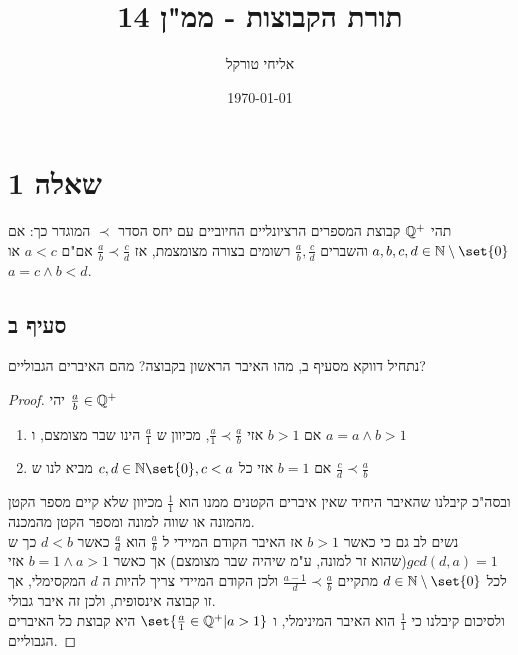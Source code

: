 \documentclass{article}
\title{תורת הקבוצות - ממ"ן 14}
\author{אליחי טורקל \ID}
\date\today
\DeclarePairedDelimiter\set\{\}
\begin{document}
	\maketitle %


	\section*{שאלה 1}
    תהי $\mathbb{Q}^{+}$ קבוצת המספרים הרציונליים החיוביים עם יחס הסדר $\prec$ המוגדר כך:
    אם $a,b,c,d \in \NN \sub \set{0}$ והשברים $\frac{a}{b}, \frac{c}{d}$ רשומים בצורה מצומצמת,
    אז $\frac{a}{b} \prec \frac{c}{d}$ אם"ם $a < c$ או $a = c \land b < d$.

    \subsection*{סעיף ב}
    נתחיל דווקא מסעיף ב,
    מהו האיבר הראשון בקבוצה? מהם האיברים הגבוליים?

    \begin{proof}
        יהי $\frac{a}{b} \in \mathbb{Q}^{+}$
        \begin{enumerate}
            \item אם $b > 1$ אזי $\frac{a}{1} \prec \frac{a}{b}$, מכיוון ש $\frac{a}{1}$ הינו שבר מצומצם, ו $a=a \land b >1$
            \item אם $b=1$ אזי כל $c,d \in \NN\set{0}, c < a$ מביא לנו ש $\frac{c}{d} \prec \frac{a}{b}$
        \end{enumerate}
        ובסה"כ קיבלנו שהאיבר היחיד שאין איברים הקטנים ממנו הוא $\frac{1}{1}$ מכיוון שלא קיים מספר הקטן מהמונה או שווה למונה ומספר הקטן מהמכנה. \\
        נשים לב גם כי כאשר $b > 1$ אז האיבר הקודם המיידי ל $\frac{a}{b}$ הוא $\frac{a}{d}$ כאשר $d < b$ כך ש $gcd(d,a) = 1$(שהוא זר למונה, ע"מ שיהיה שבר מצומצם)
        אך כאשר $b=1 \land a > 1$ אזי לכל $d \in \NN \sub \set{0}$ מתקיים $\frac{a-1}{d} \prec \frac{a}{b}$ ולכן הקודם המיידי צריך להיות ה $d$ המקסימלי, אך זו קבוצה אינסופית, ולכן זה איבר גבולי. \\
        ולסיכום קיבלנו כי $\frac{1}{1}$ הוא האיבר המינימלי, ו $\set{\frac{a}{1} \in \QQ^{+} | a > 1}$ היא קבוצת כל האיברים הגבוליים.
    \end{proof}
\end{document}
